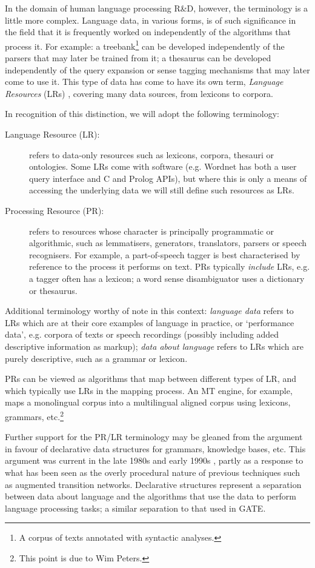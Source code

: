 In the domain of human language processing R\&D, however, the
terminology is a little more complex.
Language data, in various forms, is of such
significance in the field that it is frequently worked on independently
of the algorithms that process it. For example: a treebank\footnote{A
corpus of texts annotated with syntactic analyses.}
can be developed independently of the
parsers that may later be trained from it; a thesaurus can be developed
independently of the query expansion or sense tagging mechanisms that may later
come to use it. This type of data has come to have its
own term, {\it Language Resources} (LRs) \cite{Lrec98}, covering many
data sources, from lexicons to corpora.

In recognition of this distinction, we will adopt the following
terminology:
%
\begin{description}
%
\item[Language Resource (LR):] refers to data-only resources such as
lexicons, corpora, thesauri or ontologies.
Some LRs come with software (e.g. Wordnet has both a user
query interface and C and Prolog APIs), but where this is only a means of
accessing the underlying data we will still define such resources as LRs.
%
\item[Processing Resource (PR):] refers to resources whose character is
principally programmatic or algorithmic, such as lemmatisers, generators,
translators, parsers or speech recognisers. For example, a part-of-speech
tagger is best characterised by reference to the process it performs on
text. PRs typically {\it include} LRs, e.g. a tagger often has a lexicon; a
word sense disambiguator uses a dictionary or thesaurus.
%
\end{description}
%
Additional terminology worthy of note in this context:
{\it language data}
refers to LRs which are at their core examples of language in practice, or
`performance data', e.g. corpora of texts
or speech recordings (possibly including
added descriptive information as markup);
{\it data about language} refers to LRs which are purely descriptive, such as a
grammar or lexicon.

PRs can be viewed as algorithms that map between different types of LR,
and which typically use LRs in the mapping process. An MT engine, for
example, maps a monolingual corpus into a multilingual aligned corpus
using lexicons, grammars, etc.\footnote{This point is due to Wim Peters.}

Further support for the PR/LR terminology may be gleaned from the argument in
favour of declarative data structures for grammars, knowledge bases, etc. This
argument was current in the late 1980s and early 1990s \cite{Gaz89},
partly as a response to what has been seen as the overly
procedural nature of previous techniques such as augmented transition networks.
Declarative structures represent a separation between data about language and
the algorithms that use the data to perform language processing tasks; a similar
separation to that used in GATE.

